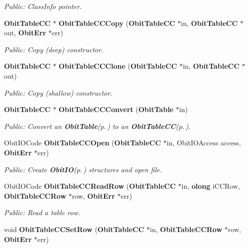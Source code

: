 \begin{CompactItemize}
\begin{CompactList}\small\item\em Public: Class\-Info pointer. \item\end{CompactList}\item 
{\bf Obit\-Table\-CC} $\ast$ {\bf Obit\-Table\-CCCopy} ({\bf Obit\-Table\-CC} $\ast$in, {\bf Obit\-Table\-CC} $\ast$out, {\bf Obit\-Err} $\ast$err)
\begin{CompactList}\small\item\em Public: Copy (deep) constructor. \item\end{CompactList}\item 
{\bf Obit\-Table\-CC} $\ast$ {\bf Obit\-Table\-CCClone} ({\bf Obit\-Table\-CC} $\ast$in, {\bf Obit\-Table\-CC} $\ast$out)
\begin{CompactList}\small\item\em Public: Copy (shallow) constructor. \item\end{CompactList}\item 
{\bf Obit\-Table\-CC} $\ast$ {\bf Obit\-Table\-CCConvert} ({\bf Obit\-Table} $\ast$in)
\begin{CompactList}\small\item\em Public: Convert an {\bf Obit\-Table}{\rm (p.\,\pageref{structObitTable})} to an {\bf Obit\-Table\-CC}{\rm (p.\,\pageref{structObitTableCC})}. \item\end{CompactList}\item 
Obit\-IOCode {\bf Obit\-Table\-CCOpen} ({\bf Obit\-Table\-CC} $\ast$in, Obit\-IOAccess access, {\bf Obit\-Err} $\ast$err)
\begin{CompactList}\small\item\em Public: Create {\bf Obit\-IO}{\rm (p.\,\pageref{structObitIO})} structures and open file. \item\end{CompactList}\item 
Obit\-IOCode {\bf Obit\-Table\-CCRead\-Row} ({\bf Obit\-Table\-CC} $\ast$in, {\bf olong} i\-CCRow, {\bf Obit\-Table\-CCRow} $\ast$row, {\bf Obit\-Err} $\ast$err)
\begin{CompactList}\small\item\em Public: Read a table row. \item\end{CompactList}\item 
void {\bf Obit\-Table\-CCSet\-Row} ({\bf Obit\-Table\-CC} $\ast$in, {\bf Obit\-Table\-CCRow} $\ast$row, {\bf Obit\-Err} $\ast$err)

\end{CompactItemize}

